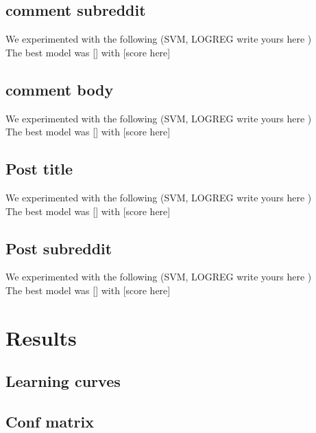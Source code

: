 \documentclass{article}
\begin{document}
    \subsection{comment subreddit}
        We experimented with the following (SVM, LOGREG write yours here )\\
        The best model was [] with [score here]
    \subsection{comment body}
        We experimented with the following (SVM, LOGREG write yours here )\\
        The best model was [] with [score here]
    \subsection{Post title}
        We experimented with the following (SVM, LOGREG write yours here )\\
        The best model was [] with [score here]
    \subsection{Post subreddit}  
        We experimented with the following (SVM, LOGREG write yours here )\\
        The best model was [] with [score here]
\section{Results}
    \subsection{Learning curves}
    \subsection{Conf matrix}
\end{document}
